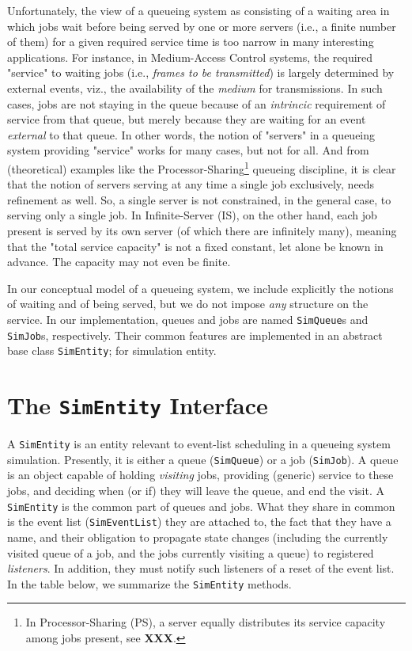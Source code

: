 \documentclass[12pt]{book}
\begin{document}
Unfortunately,
  the view of a queueing system as consisting of a waiting area
  in which jobs wait before being served by one or more servers
  (i.e., a finite number of them)
  for a given required service time is too narrow in many
  interesting applications.
For instance, in Medium-Access Control systems,
  the required "service" to waiting jobs
  (i.e., {\em frames to be transmitted\/})
  is largely determined by external events,
  viz.,
  the availability of the {\em medium\/} for transmissions.
In such cases, jobs are not staying in the queue because of an
  {\em intrincic\/} requirement of service from that queue,
  but merely because they are waiting for an event {\em external\/}
  to that queue.
In other words, the notion of "servers" in a queueing system
  providing "service" works for many cases, but not for all.
And from (theoretical) examples like the Processor-Sharing\footnote{
In Processor-Sharing (PS),
  a server equally distributes its service capacity
  among jobs present, see {\bf XXX}.}
  queueing discipline,
  it is clear that the notion of servers serving
  at any time a single job exclusively,
  needs refinement as well.
So, a single server is not constrained,
  in the general case,
  to serving only a single job.
In Infinite-Server (IS), on the other hand,
  each job present is served by its own server
  (of which there are infinitely many),
  meaning that the "total service capacity"
  is not a fixed constant, let alone be known in advance.
The capacity may not even be finite.

In our conceptual model of a queueing system,
  we include explicitly the notions of waiting and of being served,
  but we do not impose {\em any\/} structure on the service.
In our implementation, queues and jobs are
  named \lstinline-SimQueue-s and \lstinline-SimJob-s, respectively.
Their common features are implemented in an abstract base class
  \lstinline-SimEntity-; for simulation entity.

\section{The \lstinline|SimEntity| Interface}

A \lstinline-SimEntity-
  is an entity relevant to event-list scheduling in a queueing system simulation.
Presently, it is either a queue (\lstinline-SimQueue-) or a job (\lstinline-SimJob-).
A queue is an object capable of holding {\em visiting\/} jobs,
  providing (generic) service to these jobs,
  and deciding when (or if) they will leave the queue,
  and end the visit.
A \lstinline-SimEntity- is the common part of queues and jobs.
What they share in common is the event list (\lstinline-SimEventList-) they are attached to,
  the fact that they have a name,
  and their obligation to propagate
  state changes
    (including the currently visited queue of a job,
    and the jobs currently visiting a queue)
  to registered {\em listeners}.
In addition,
  they must notify such listeners of a reset of the event list.
In the table below, we summarize the \lstinline-SimEntity- methods.
\end{document}
